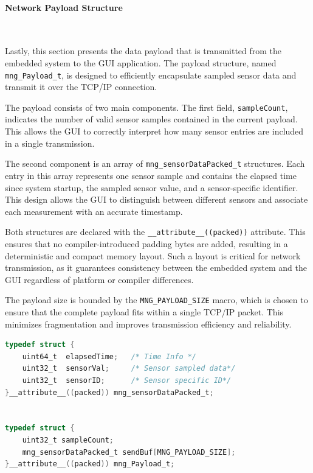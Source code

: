 \paragraph{Network Payload Structure}\

Lastly, this section presents the data payload that is transmitted from the embedded 
system to the GUI application. The payload structure, named \texttt{mng\_Payload\_t}, 
is designed to efficiently encapsulate sampled sensor data and transmit it over the 
TCP/IP connection.

The payload consists of two main components. The first field, \texttt{sampleCount}, 
indicates the number of valid sensor samples contained in the current payload. This 
allows the GUI to correctly interpret how many sensor entries are included in a single 
transmission.

The second component is an array of \texttt{mng\_sensorDataPacked\_t} structures. Each 
entry in this array represents one sensor sample and contains the elapsed time since 
system startup, the sampled sensor value, and a sensor-specific identifier. This design 
allows the GUI to distinguish between different sensors and associate each measurement 
with an accurate timestamp.

Both structures are declared with the \texttt{\_\_attribute\_\_((packed))} attribute. 
This ensures that no compiler-introduced padding bytes are added, resulting in a 
deterministic and compact memory layout. Such a layout is critical for network 
transmission, as it guarantees consistency between the embedded system and the GUI 
regardless of platform or compiler differences.

The payload size is bounded by the \texttt{MNG\_PAYLOAD\_SIZE} macro, which is chosen 
to ensure that the complete payload fits within a single TCP/IP packet. This minimizes 
fragmentation and improves transmission efficiency and reliability.

\begin{lstlisting}[language=C,
caption={Network Payload Structures},
label={lst:payloads}]
typedef struct {
    uint64_t  elapsedTime;   /* Time Info */
    uint32_t  sensorVal;     /* Sensor sampled data*/
    uint32_t  sensorID;      /* Sensor specific ID*/
}__attribute__((packed)) mng_sensorDataPacked_t;


typedef struct {
    uint32_t sampleCount;
    mng_sensorDataPacked_t sendBuf[MNG_PAYLOAD_SIZE];
}__attribute__((packed)) mng_Payload_t;
\end{lstlisting}

